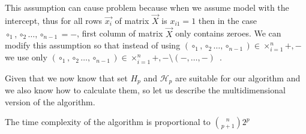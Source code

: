 This assumption can cause problem because when we assume model with the intercept, thus for all rows $\vec{x_i}$ of matrix $\vec{X}$ is $x_{i1} = 1$ then in the case  $\circ_1,\circ_2 \ldots,  \circ_{n-1} = -$, first column of matrix $\vec{X}$ only contains zeroes. We can modify this assumption so that instead of using $(\circ_1,\circ_2 \ldots,  \circ_{n-1}) \in \times^n_{i=1} {+, -}$ we use only $(\circ_1,\circ_2 \ldots,  \circ_{n-1}) \in \times^n_{i=1} {+, -} \setminus {(-, \ldots, -)}$~\cite{klouda2015exact}. 

Given that we now know that set $H_p$ and $\mathcal{H}_p$ are suitable for our algorithm and we also know how to calculate them, so let us describe the multidimensional version of the algorithm.


The time complexity of the algorithm is proportional to $\binom{n}{p+1} 2^p$